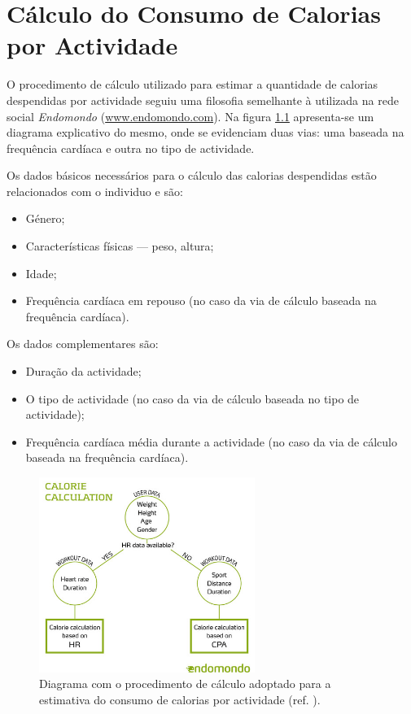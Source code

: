 \documentclass[a4paper,10pt]{report}
\begin{document}
\chapter{Cálculo do Consumo de Calorias por Actividade}
\label{cap:calorias}
O procedimento de cálculo utilizado para estimar a quantidade de calorias despendidas por actividade seguiu uma filosofia semelhante à utilizada 
na rede social \emph{Endomondo} (\url{www.endomondo.com}). 
Na figura \ref{fig:caloriasProcedimento} apresenta-se um diagrama explicativo do mesmo, onde se evidenciam duas vias: uma baseada na frequência 
cardíaca e outra no tipo de actividade.

Os dados básicos necessários para o cálculo das calorias despendidas estão relacionados com o individuo e são:
\begin{itemize}
 \item Género;
 \item Características físicas --- peso, altura;
 \item Idade;
 \item Frequência cardíaca em repouso (no caso da via de cálculo baseada na frequência cardíaca).
\end{itemize}

Os dados complementares são:
\begin{itemize}
 \item Duração da actividade;
 \item O tipo de actividade (no caso da via de cálculo baseada no tipo de actividade);
 \item Frequência cardíaca média durante a actividade (no caso da via de cálculo baseada na frequência cardíaca).
\end{itemize}

\begin{figure}
\centering
\includegraphics[width=7cm]{endomondoCalories.jpg}
\caption{Diagrama com o procedimento de cálculo adoptado para a estimativa do consumo de calorias por actividade (ref. \cite{endomondo}).}
\label{fig:caloriasProcedimento}
\end{figure}
\end{document}
